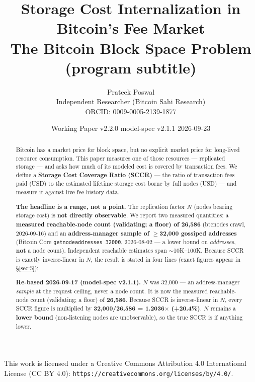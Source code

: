 \documentclass[11pt]{article}
\title{\textbf{Storage Cost Internalization in Bitcoin's Fee Market}\\[0.4em] \large The Bitcoin Block Space Problem (program subtitle)}
\author{Prateek Poswal\\ \small Independent Researcher (Bitcoin Sahi Research)\\ \small ORCID: 0009-0005-2139-1877}
\date{Working Paper v2.2.0 \textbullet{} model-spec v2.1.1 \textbullet{} 2026-09-23}
\begin{document}
\maketitle
\vspace{-2em}
{\footnotesize This work is licensed under a Creative Commons Attribution 4.0 International License (CC BY 4.0): \texttt{https://creativecommons.org/licenses/by/4.0/}.}
\vspace{1em}

\begin{abstract}
Bitcoin has a market price for block space, but no explicit market price for long-lived resource consumption. This paper measures one of those resources --- replicated storage --- and asks how much of its modeled cost is covered by transaction fees. We define a \textbf{Storage Cost Coverage Ratio (SCCR)} --- the ratio of transaction fees paid (USD) to the estimated lifetime storage cost borne by full nodes (USD) --- and measure it against live fee-history data.

\textbf{The headline is a range, not a point.} The replication factor $N$ (nodes bearing storage cost) is \textbf{not directly observable}. We report two measured quantities: a \textbf{measured reachable-node count (validating; a floor) of 26{,}586} (btcnodes crawl, 2026-09-16) and an \textbf{address-manager sample of $\geq$32{,}000 gossiped addresses} (Bitcoin Core \texttt{getnodeaddresses 32000}, 2026-08-02 --- a lower bound on \emph{addresses}, \textbf{not} a node count). Independent reachable estimates span $\sim$10K--100K. Because SCCR is exactly inverse-linear in $N$, the result is stated in four lines (exact figures appear in \S\ref{sec:5}):

\textbf{Re-based 2026-09-17 (model-spec v2.1.1).} $N$ was 32{,}000 --- an address-manager \emph{sample} at the request ceiling, never a node count. It is now the measured reachable-node count (validating; a floor) of \textbf{26{,}586}. Because SCCR is inverse-linear in $N$, every SCCR figure is multiplied by \textbf{32{,}000/26{,}586 = 1.2036$\times$ (+20.4\%)}. $N$ remains a \textbf{lower bound} (non-listening nodes are unobservable), so the true SCCR is if anything lower.


\end{abstract}
\end{document}
